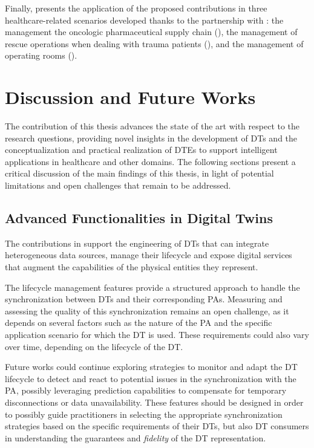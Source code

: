 Finally,  presents the application of the proposed contributions in three healthcare-related scenarios developed thanks to the partnership with \ausl{}: the management the oncologic pharmaceutical supply chain (), the management of rescue operations when dealing with trauma patients (), and the management of operating rooms ().

\section*{Discussion and Future Works}


The contribution of this thesis advances the state of the art with respect to the research questions, providing novel insights in the development of \acp{DT} and the conceptualization and practical realization of \acp{DTE} to support intelligent applications in healthcare and other domains.
%
The following sections present a critical discussion of the main findings of this thesis, in light of potential limitations and open challenges that remain to be addressed.

\subsection*{Advanced Functionalities in Digital Twins}

The contributions in  support the engineering of \acp{DT} that can integrate heterogeneous data sources, manage their lifecycle and expose digital services that augment the capabilities of the physical entities they represent. 

The lifecycle management features provide a structured approach to handle the synchronization between \acp{DT} and their corresponding \acp{PA}.
%
Measuring and assessing the quality of this synchronization remains an open challenge, as it depends on several factors such as the nature of the \ac{PA} and the specific application scenario for which the \ac{DT} is used.
%
These requirements could also vary over time, depending on the lifecycle of the \ac{DT}. 

Future works could continue exploring strategies to monitor and adapt the \ac{DT} lifecycle to detect and react to potential issues in the synchronization with the \ac{PA}, possibly leveraging prediction capabilities to compensate for temporary disconnections or data unavailability. 
%
These features should be designed in order to possibly guide practitioners in selecting the appropriate synchronization strategies based on the specific requirements of their \acp{DT}, but also \ac{DT} consumers in understanding the guarantees and \emph{fidelity} of the \ac{DT} representation.

